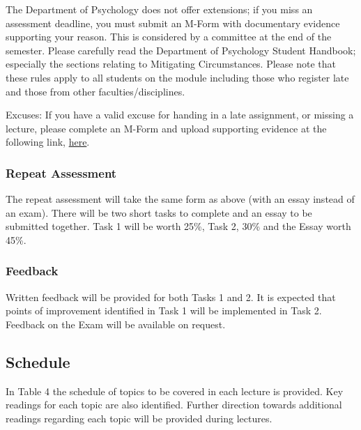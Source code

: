 \documentclass[
  x11names]{article}
\begin{document}
The Department of Psychology does not offer extensions; if you miss an
assessment deadline, you must submit an M-Form with documentary evidence
supporting your reason. This is considered by a committee at the end of
the semester. Please carefully read the Department of Psychology Student
Handbook; especially the sections relating to Mitigating Circumstances.
Please note that these rules apply to all students on the module
including those who register late and those from other
faculties/disciplines.

Excuses: If you have a valid excuse for handing in a late assignment, or
missing a lecture, please complete an M-Form and upload supporting
evidence at the following link,
\color{blue}\href{https://workflow.ul.ie/MForms/MForms/}{here}\color{black}.

\subsubsection{Repeat Assessment}\label{repeat-assessment}

The repeat assessment will take the same form as above (with an essay
instead of an exam). There will be two short tasks to complete and an
essay to be submitted together. Task 1 will be worth 25\%, Task 2, 30\%
and the Essay worth 45\%.

\subsubsection{Feedback}\label{feedback}

Written feedback will be provided for both Tasks 1 and 2. It is expected
that points of improvement identified in Task 1 will be implemented in
Task 2. Feedback on the Exam will be available on request.

\pagebreak

\subsection{Schedule}\label{schedule}

In Table 4 the schedule of topics to be covered in each lecture is
provided. Key readings for each topic are also identified. Further
direction towards additional readings regarding each topic will be
provided during lectures.
\end{document}
